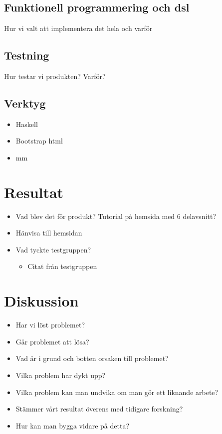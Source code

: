 \documentclass{article}
\begin{document}
\subsection{Funktionell programmering och dsl}
Hur vi valt att implementera det hela och varför

\subsection{Testning}
Hur testar vi produkten? Varför?

\subsection{Verktyg} 
\begin{itemize}
\item Haskell 
\item Bootstrap html
\item mm
\end{itemize}


\section{Resultat}
\begin{itemize}
\item Vad blev det för produkt? Tutorial på hemsida med 6 delavsnitt?
\item Hänvisa till hemsidan
\item Vad tyckte testgruppen?
\begin{itemize}
\item Citat från testgruppen
\end{itemize}
\end{itemize}

\section{Diskussion}
\begin{itemize}
\item Har vi löst problemet?
\item Går problemet att lösa?
\item Vad är i grund och botten orsaken till problemet?
\item Vilka problem har dykt upp?
\item Vilka problem kan man undvika om man gör ett liknande arbete?
\item Stämmer vårt resultat överens med tidigare forskning?
\item Hur kan man bygga vidare på detta?
\end{itemize}
\end{document}

